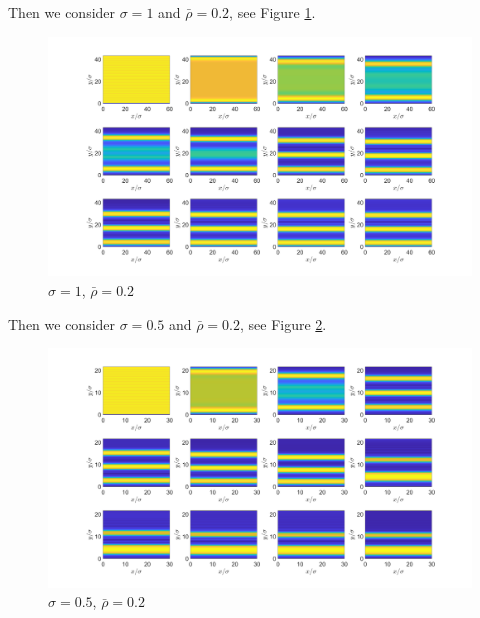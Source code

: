 \documentclass[11pt, a4paper]{article}
\theoremstyle{definition}
\begin{document}
	Then we consider $\sigma = 1$ and $\bar \rho = 0.2$, see Figure \ref{F6}.
	\begin{figure}[h]
		\centering
		\includegraphics[scale=0.25]{Periodic3.png}
		\caption{$\sigma =1$, $\bar \rho =0.2$} 
		\label{F6}
	\end{figure}
	Then we consider $\sigma = 0.5$ and $\bar \rho = 0.2$, see Figure \ref{F7}.
	\begin{figure}[h]
		\centering
		\includegraphics[scale=0.25]{Periodic4.png}
		\caption{$\sigma =0.5$, $\bar \rho =0.2$} 
		\label{F7}
	\end{figure}
	
	
\end{document}
